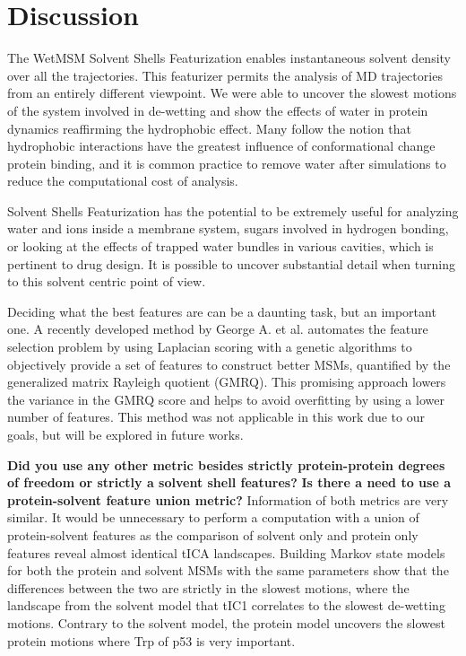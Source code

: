

\section{Discussion}




The WetMSM Solvent Shells Featurization enables instantaneous solvent density over all the trajectories.  This featurizer permits the analysis of MD trajectories from an entirely different viewpoint. We were able to uncover the slowest motions of the system involved in de-wetting and show the effects of water in protein dynamics reaffirming the hydrophobic effect.  Many follow the notion that hydrophobic interactions have the greatest influence of conformational change protein binding, and it is common practice to remove water after simulations to reduce the computational cost of analysis.

Solvent Shells Featurization has the potential to be extremely useful for analyzing water and ions inside a membrane system, sugars involved in hydrogen bonding, or looking at the effects of trapped water bundles in various cavities, which is pertinent to drug design.  It is possible to  uncover substantial detail when turning to this solvent centric point of view.

Deciding what the best features are can be a daunting task, but an important one. A recently developed method by George A. et al. \cite{george2020laplacian} automates the feature selection problem by using Laplacian scoring with a genetic algorithms to objectively provide a set of features to construct better MSMs, quantified by the generalized matrix Rayleigh quotient (GMRQ).  This promising approach lowers the variance in the GMRQ score and helps to avoid overfitting by using a lower number of features. This method was not applicable in this work due to our goals, but will be explored in future works.


\textbf{Did you use any other metric besides strictly protein-protein degrees of freedom or strictly a solvent shell features?} \textbf{Is there a need to use a protein-solvent feature union metric?} Information of both metrics are very similar. It would be unnecessary to perform a computation with a union of protein-solvent features as the comparison of solvent only and protein only features reveal almost identical tICA landscapes. Building Markov state models for both the protein and solvent MSMs with the same parameters show that the differences between the two are strictly in the slowest motions, where the landscape from the solvent model that tIC1 correlates to the slowest de-wetting motions. Contrary to the solvent model, the protein model uncovers the slowest protein motions where Trp of p53 is very important.

